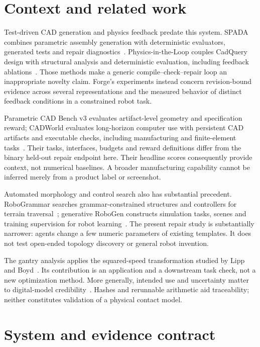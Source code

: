 \section{Context and related work}
Test-driven CAD generation and physics feedback predate this system. SPADA combines parametric assembly generation with deterministic evaluators, generated tests and repair diagnostics~\cite{zheng2026spada}. Physics-in-the-Loop couples CadQuery design with structural analysis and deterministic evaluation, including feedback ablations~\cite{berger2026physics}. Those methods make a generic compile--check--repair loop an inappropriate novelty claim. Forge's experiments instead concern revision-bound evidence across several representations and the measured behavior of distinct feedback conditions in a constrained robot task.

Parametric CAD Bench v3 evaluates artifact-level geometry and specification reward; CADWorld evaluates long-horizon computer use with persistent CAD artifacts and executable checks, including manufacturing and finite-element tasks~\cite{chen2026parametriccadbench,dong2026cadworld}. Their tasks, interfaces, budgets and reward definitions differ from the binary held-out repair endpoint here. Their headline scores consequently provide context, not numerical baselines. A broader manufacturing capability cannot be inferred merely from a product label or screenshot.

Automated morphology and control search also has substantial precedent. RoboGrammar searches grammar-constrained structures and controllers for terrain traversal~\cite{zhao2020robogrammar}; generative RoboGen constructs simulation tasks, scenes and training supervision for robot learning~\cite{wang2024robogen}. The present repair study is substantially narrower: agents change a few numeric parameters of existing templates. It does not test open-ended topology discovery or general robot invention.

The gantry analysis applies the squared-speed transformation studied by Lipp and Boyd~\cite{lipp2014minimum}. Its contribution is an application and a downstream task check, not a new optimization method. More generally, intended use and uncertainty matter to digital-model credibility~\cite{shao2023credibility}. Hashes and rerunnable arithmetic aid traceability; neither constitutes validation of a physical contact model.

\section{System and evidence contract}
